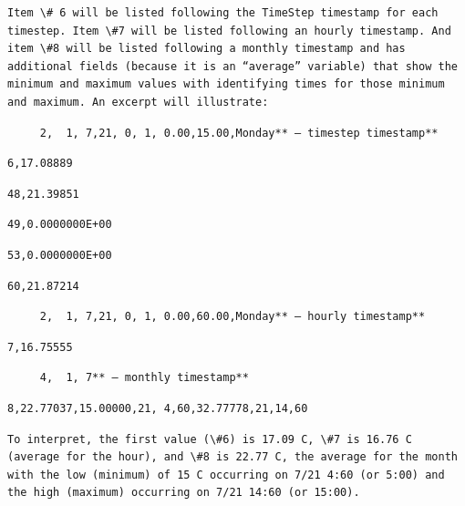 \begin{lstlisting}
Item \# 6 will be listed following the TimeStep timestamp for each timestep. Item \#7 will be listed following an hourly timestamp. And item \#8 will be listed following a monthly timestamp and has additional fields (because it is an “average” variable) that show the minimum and maximum values with identifying times for those minimum and maximum. An excerpt will illustrate:
\end{lstlisting}

\begin{lstlisting}
     2,  1, 7,21, 0, 1, 0.00,15.00,Monday** – timestep timestamp**
\end{lstlisting}

\begin{lstlisting}
6,17.08889
\end{lstlisting}

\begin{lstlisting}
48,21.39851
\end{lstlisting}

\begin{lstlisting}
49,0.0000000E+00
\end{lstlisting}

\begin{lstlisting}
53,0.0000000E+00
\end{lstlisting}

\begin{lstlisting}
60,21.87214
\end{lstlisting}

\begin{lstlisting}
     2,  1, 7,21, 0, 1, 0.00,60.00,Monday** – hourly timestamp**
\end{lstlisting}

\begin{lstlisting}
7,16.75555
\end{lstlisting}

\begin{lstlisting}
     4,  1, 7** – monthly timestamp**
\end{lstlisting}

\begin{lstlisting}
8,22.77037,15.00000,21, 4,60,32.77778,21,14,60
\end{lstlisting}

\begin{lstlisting}
To interpret, the first value (\#6) is 17.09 C, \#7 is 16.76 C (average for the hour), and \#8 is 22.77 C, the average for the month with the low (minimum) of 15 C occurring on 7/21 4:60 (or 5:00) and the high (maximum) occurring on 7/21 14:60 (or 15:00).
\end{lstlisting}

